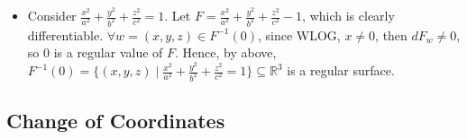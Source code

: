 \begin{itemize}
\begin{proof}
$\forall p\in f^{-1}(a)$, assume WLOG that $\dfrac{\partial f}{\partial z}(p)\neq 0$. Consider $F := f - c_a$ where $c_a$ is the constant map. Then $\forall p\in f^{-1}(a)$, $F(p) = f(p) - a = 0$ and $\dfrac{\partial F}{\partial z}(p) = \dfrac{\partial f}{\partial z}(p)\neq 0$. Hence, we can apply the Implicit Function Thm, $\exists\ g: U\subseteq\mathbb{R}^2\to\mathbb{R}$ smooth, s.t.: $F(u, v, g(u,v)) = 0$. Consider
\[
W := \{(u, v, g(u,v)) \mid (u, v)\in U\}
\]
containing $p$ clearly. Since $F(W) = \{0\}$, then $p\in W\subseteq F^{-1}(0)$. Therefore, $\exists$ a neighborhood $V$ of $p$, s.t.:
\[
V\cap f^{-1}(a) = V\cap F^{-1}(0) = W = \{(x, y, z)\ \big|\ (x, y)\in U,\ z = g(x, y)\}
\]
i.e.: $f^{-1}(a)$ is locally a graph of smooth function. 
\end{proof}

\item Consider $\frac{x^2}{a^2}+ \frac{y^2}{b^2}+ \frac{z^2}{c^2} =1$. Let $F= \frac{x^2}{a^2}+ \frac{y^2}{b^2}+ \frac{z^2}{c^2} -1$, which is clearly differentiable. $\forall w= (x,y,z)\in F^{-1} (0)$, since WLOG, $x \neq 0$, then $dF_w \neq 0$, so $0$ is a regular value of $F$. Hence, by above, $F^{-1} (0) = \{(x,y,z) \mid \frac{x^2}{a^2}+ \frac{y^2}{b^2}+ \frac{z^2}{c^2} =1\} \subseteq \mathbb{R}^3$ is a regular surface.
\end{itemize}

\subsection{Change of Coordinates}

